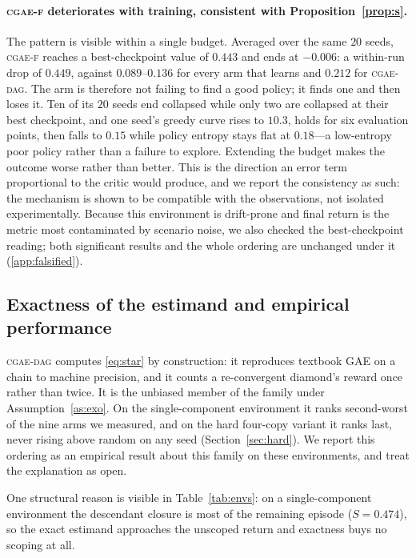 \documentclass[review,authoryear,3p,times]{elsarticle}
\newcommand{\cflowraw}{\textsc{cgae-f}}        %
\newcommand{\cdag}{\textsc{cgae-dag}}          %
\begin{document}
\paragraph{\cflowraw{} deteriorates with training, consistent with
Proposition~\ref{prop:s}.} The pattern is visible within a single budget.
Averaged over the same $20$ seeds, \cflowraw{} reaches a best-checkpoint value
of $0.443$ and ends at $-0.006$: a within-run drop of $0.449$, against
$0.089$--$0.136$ for every arm that learns and $0.212$ for \cdag. The arm is
therefore not failing to find a good policy; it finds one and then loses it. Ten
of its $20$ seeds end collapsed while only two are collapsed at their best
checkpoint, and one seed's greedy curve rises to $10.3$, holds for six
evaluation points, then falls to $0.15$ while policy entropy stays flat at
$0.18$---a low-entropy poor policy rather than a failure to explore. Extending
the budget makes the outcome worse rather than better. This is the direction an
error term proportional to the critic would produce, and we report the
consistency as such: the mechanism is shown to be compatible with the
observations, not isolated experimentally. Because this environment is
drift-prone and final return is the metric most contaminated by scenario noise,
we also checked the best-checkpoint reading; both significant results and the
whole ordering are unchanged under it (\ref{app:falsified}).

\subsection{Exactness of the estimand and empirical performance}
\label{sec:exactness}

\cdag{} computes \eqref{eq:star} by construction: it reproduces textbook GAE on
a chain to machine precision, and it counts a re-convergent diamond's reward
once rather than twice. It is the unbiased member of the family under
Assumption~\ref{as:exo}. On the single-component environment it ranks
second-worst of the nine arms we measured, and on the hard four-copy variant it
ranks last, never rising above random on any seed (Section~\ref{sec:hard}). We
report this ordering as an empirical result about this family on these
environments, and treat the explanation as open.

One structural reason is visible in Table~\ref{tab:envs}: on a single-component
environment the descendant closure is most of the remaining episode
($S=0.474$), so the exact estimand approaches the unscoped return and exactness
buys no scoping at all.
\end{document}
